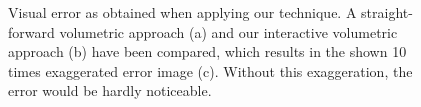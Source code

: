 \documentclass[review,journal]{vgtc}         %
\begin{document}
\begin{figure}
    \centering
    \caption{Visual error as obtained when applying our technique. A straight-forward volumetric approach (a) and our interactive volumetric approach (b) have been compared, which results in the shown 10 times exaggerated error image (c). Without this exaggeration, the error would be hardly noticeable.}
    \label{fig:heart-analysis}
\end{figure}
\end{document}
